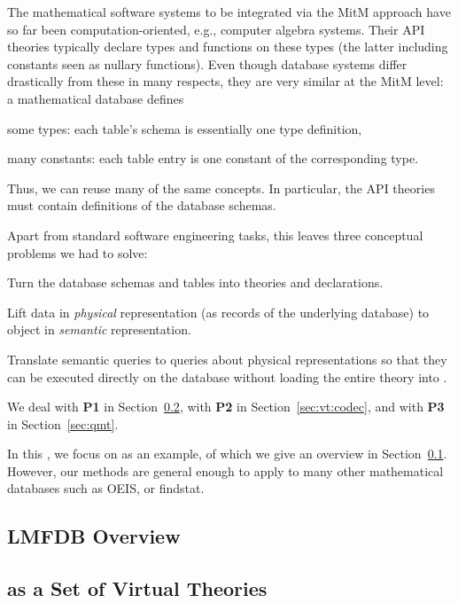 The mathematical software systems to be integrated via the MitM approach have so far been computation-oriented, e.g., computer algebra systems.
Their API theories typically declare types and functions on these types (the latter including constants seen as nullary functions).
Even though database systems differ drastically from these in many respects, they are very similar at the MitM level: a mathematical database defines
\begin{compactitem}
 \item some types: each table's schema is essentially one type definition,
 \item many constants: each table entry is one constant of the corresponding type.
\end{compactitem}
Thus, we can reuse many of the same concepts.
In particular, the API theories must contain definitions of the database schemas. 

Apart from standard software engineering tasks, this leaves three conceptual problems we had to solve:
\begin{compactenum}[\bf P1]
\item Turn the database schemas and tables into \ommt theories and declarations. 
\item Lift data in \emph{physical} representation (as records of the
  underlying database) to \ommt object in \emph{semantic} representation.
\item Translate semantic queries to queries about physical representations so
  that they can be executed directly on the database without loading the entire theory into
  \mmt.
\end{compactenum}
We deal with \textbf{P1} in Section~\ref{sec:vt}, with \textbf{P2} in Section~\ref{sec:vt:codec}, and with \textbf{P3} in Section~\ref{sec:qmt}. 

In this \papertype, we focus on \lmfdb as an example, of which we give an overview in Section~\ref{sec:lmfdb}.
However, our methods are general enough to apply to many other mathematical databases such as OEIS, or findstat.

 \subsection{LMFDB Overview}\label{sec:lmfdb}
  
 \subsection[Virtual Theories]{\lmfdb as a Set of Virtual Theories}\label{sec:vt}
  
